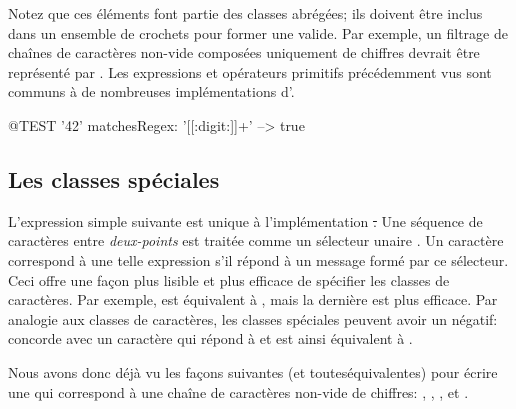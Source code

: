 \documentclass[a4paper,10pt,twoside]{book}
\begin{document}
{Notez que ces éléments font partie des classes abrégées; ils doivent
être inclus dans un ensemble de crochets pour former une \expreg
valide. Par exemple, un filtrage de chaînes de caractères non-vide composées
uniquement de chiffres devrait être représenté par \ct{[[:digit:]]+}.
Les expressions et opérateurs primitifs précédemment vus sont communs
à de nombreuses implémentations d'\expregs.

\begin{code}{@TEST}
'42' matchesRegex: '[[:digit:]]+' --> true
\end{code}

\subsection{Les classes spéciales}
L'expression simple suivante est unique à l'implémentation \st. Une
séquence de caractères entre \emph{deux-points} est traitée comme un
sélecteur unaire .
Un caractère correspond à une telle expression s'il répond 
à un message formé par ce sélecteur.
Ceci offre une façon plus lisible et plus efficace de spécifier les
classes de caractères. Par exemple, \ct{[0-9]} est équivalent à
, mais la dernière est plus efficace. Par analogie aux
classes de caractères, les classes spéciales peuvent avoir un négatif:
 concorde avec un caractère qui répond  à
  et est ainsi équivalent à  \ct{[CARET0-9]}.

Nous avons donc déjà vu les façons suivantes (et touteséquivalentes) pour écrire une \expreg qui
correspond à une chaîne de caractères non-vide de chiffres:
\ct{[0-9]+}, \ct{\d+}, \ct{[\d]+}, \ct{[[:digit:]]+} et .

}
\end{document}
